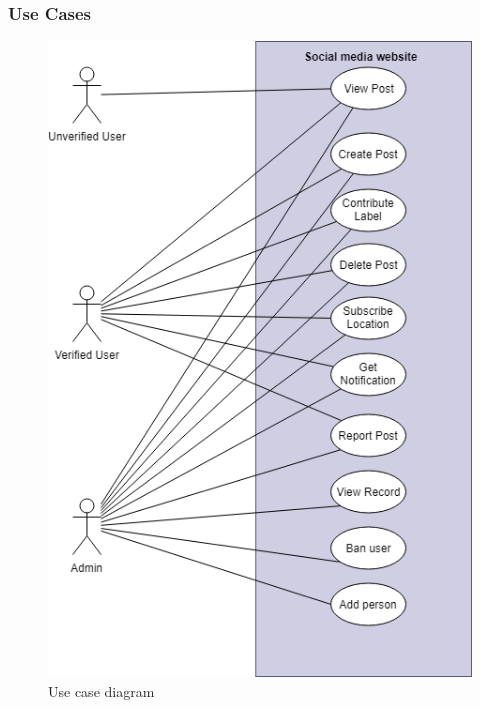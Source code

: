\subsubsection{Use Cases}
\label{chap4:usecases}
\begin{center}
	\begin{figure}[H]
		\centering
		\includegraphics[width=0.75\columnwidth]{images/chap4/usecase.png}
		\caption{Use case diagram}
		\label{chap4:user_case_diagram}
	\end{figure}
\end{center}
